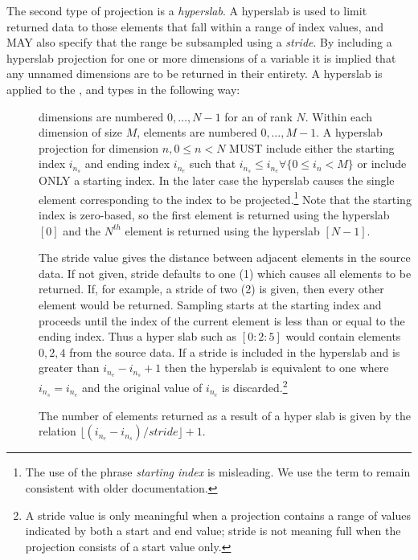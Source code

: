 \documentclass[justify]{nasa-ese}
\renewcommand{\new}[1]{\emph{#1}}
\begin{document}
The second type of projection is a \new{hyperslab}. A hyperslab is
used to limit returned data to those elements that fall within a range
of index values, and MAY also specify that the range be subsampled
using a \new{stride}. By including a hyperslab projection for one or
more dimensions of a variable it is implied that any unnamed
dimensions are to be returned in their entirety. A hyperslab is
applied to the \Array, \Grid and \Sequence types in the following way:
\begin{description}
  \item[\Array] \Array dimensions are numbered $0, \ldots, N-1$ for an
    \Array of rank $N$. Within each dimension of size $M$, elements
    are numbered $0, \ldots, M-1$. A hyperslab projection for
    dimension $n, 0 \leq n < N$ MUST include either the starting index
    $i_{n_{s}}$ and ending index $i_{n_{e}}$ such that $i_{n_{s}} \leq
    i_{n_{e}} \forall \{ 0 \leq i_{n} < M \}$ or include ONLY a
    starting index. In the later case the hyperslab causes the single
    element corresponding to the index to be projected.\footnote{The
      use of the phrase {\it starting index} is misleading. We use
      the term to remain consistent with older documentation.} Note
    that the starting index is zero-based, so the first element is
    returned using the hyperslab $[0]$ and the $N^{th}$ element is
    returned using the hyperslab $[N-1]$. 

    The stride value gives the distance between adjacent elements in
    the source data. If not given, stride defaults to one (1) which
    causes all elements to be returned. If, for example, a stride of
    two (2) is given, then every other element would be returned.
    Sampling starts at the starting index and proceeds until the index of
    the current element is less than or equal to the ending index.
    Thus a hyper slab such as $[0:2:5]$ would contain elements $0, 2,
    4$ from the source data. If a stride is included in the hyperslab
    and is greater than $i_{n_{e}} - i_{n_{s}} + 1$ then the hyperslab
    is equivalent to one where $i_{n_{s}} = i_{n_{e}}$ and the
    original value of $i_{n_{e}}$ is discarded.\footnote{A stride
      value is only meaningful when a projection contains a range of
      values indicated by both a start and end value; stride is not
      meaning full when the projection consists of a start value
      only.}

    The number of elements returned as a result of a hyper slab is
    given by the relation 
    $\lfloor ( i_{n_{e}} - i_{n_{s}} ) / stride \rfloor + 1$.


\end{description}
\end{document}
